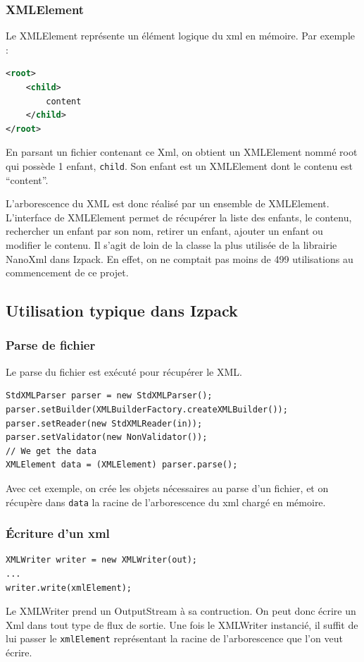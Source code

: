 \subsubsection{XMLElement}
Le XMLElement représente un élément logique du xml en mémoire. Par exemple :
\begin{lstlisting}[language=xml]
<root>
	<child>
		content
	</child>
</root>
\end{lstlisting}
En parsant un fichier contenant ce Xml, on obtient un XMLElement nommé root qui possède 1 enfant, \verb|child|. Son enfant est un XMLElement dont le contenu est ``content''.

L'arborescence du XML est donc réalisé par un ensemble de XMLElement.
L'interface de XMLElement permet de récupérer la liste des enfants, le contenu, rechercher un enfant par son nom, retirer un enfant, ajouter un enfant ou modifier le contenu.
Il s'agit de loin de la classe la plus utilisée de la librairie NanoXml dans Izpack.
En effet, on ne comptait pas moins de 499 utilisations au commencement de ce projet.
\subsection{Utilisation typique dans Izpack}
\subsubsection{Parse de fichier}
Le parse du fichier est exécuté pour récupérer le XML.
\begin{lstlisting}
StdXMLParser parser = new StdXMLParser();
parser.setBuilder(XMLBuilderFactory.createXMLBuilder());
parser.setReader(new StdXMLReader(in));
parser.setValidator(new NonValidator());
// We get the data
XMLElement data = (XMLElement) parser.parse();
\end{lstlisting}
Avec cet exemple, on crée les objets nécessaires au parse d'un fichier, et on récupère dans \verb|data| la racine de l'arborescence du xml chargé en mémoire.
\subsubsection{Écriture d'un xml}
\begin{lstlisting}
XMLWriter writer = new XMLWriter(out);
...
writer.write(xmlElement);
\end{lstlisting}
Le XMLWriter prend un OutputStream à sa contruction.
On peut donc écrire un Xml dans tout type de flux de sortie. 
Une fois le XMLWriter instancié, il suffit de lui passer le \verb|xmlElement| représentant la racine de l'arborescence que l'on veut écrire.
